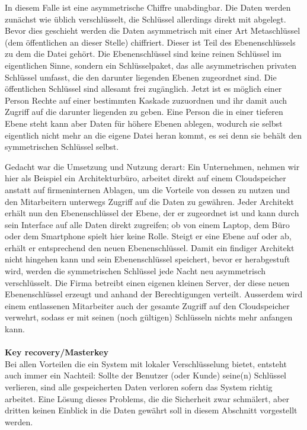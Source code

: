 \documentclass[13pt,a4paper,bibliography=totocnumbered,listof=totocnumbered]{scrartcl}
\begin{document}
In diesem Falle ist eine asymmetrische Chiffre unabdingbar. Die Daten werden zunächst wie üblich verschlüsselt, die Schlüssel allerdings direkt mit abgelegt. Bevor dies geschieht werden die Daten asymmetrisch mit einer Art Metaschlüssel (dem öffentlichen an dieser Stelle) chiffriert. Dieser ist Teil des Ebenenschlüssels zu dem die Datei gehört. Die Ebenenschlüssel sind keine reinen Schlüssel im eigentlichen Sinne, sondern ein Schlüsselpaket, das alle asymmetrischen privaten Schlüssel umfasst, die den darunter liegenden Ebenen zugeordnet sind. Die öffentlichen Schlüssel sind allesamt frei zugänglich. Jetzt ist es möglich einer Person Rechte auf einer bestimmten Kaskade zuzuordnen und ihr damit auch Zugriff auf die darunter liegenden zu geben. Eine Person die in einer tieferen Ebene steht kann aber Daten für höhere Ebenen ablegen, wodurch sie selbst eigentlich nicht mehr an die eigene Datei heran kommt, es sei denn sie behält den symmetrischen Schlüssel selbst.

Gedacht war die Umsetzung und Nutzung derart: Ein Unternehmen, nehmen wir hier als Beispiel ein Architekturbüro, arbeitet direkt auf einem Cloudspeicher anstatt auf firmeninternen Ablagen, um die Vorteile von dessen zu nutzen und den Mitarbeitern unterwegs Zugriff auf die Daten zu gewähren. Jeder Architekt erhält nun den Ebenenschlüssel der Ebene, der er zugeordnet ist und kann durch sein Interface auf alle Daten direkt zugreifen; ob von einem Laptop, dem Büro oder dem Smartphone spielt hier keine Rolle. Steigt er eine Ebene auf oder ab, erhält er entsprechend den neuen Ebenenschlüssel. Damit ein findiger Architekt nicht hingehen kann und sein Ebenenschlüssel speichert, bevor er herabgestuft wird, werden die symmetrischen Schlüssel jede Nacht neu asymmetrisch verschlüsselt. Die Firma betreibt einen eigenen kleinen Server, der diese neuen Ebenenschlüssel erzeugt und anhand der Berechtigungen verteilt. Ausserdem wird einem entlassenen Mitarbeiter auch der gesamte Zugriff auf den Cloudspeicher verwehrt, sodass er mit seinen (noch gültigen) Schlüsseln nichts mehr anfangen kann.\\
\\\textbf{Key recovery/Masterkey}\\
Bei allen Vorteilen die ein System mit lokaler Verschlüsselung bietet, entsteht auch immer ein Nachteil: Sollte der Benutzer (oder Kunde) seine(n) Schlüssel verlieren, sind alle gespeicherten Daten verloren sofern das System richtig arbeitet. Eine Lösung dieses Problems, die die Sicherheit zwar schmälert, aber dritten keinen Einblick in die Daten gewährt soll in diesem Abschnitt vorgestellt werden.
\end{document}
